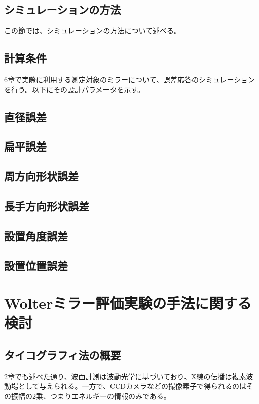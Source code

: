 \documentclass[dvipdfmx,autodetect-engine]{jreport}
\begin{document}
\section{シミュレーションの方法}
この節では、シミュレーションの方法について述べる。

\section{計算条件}
6章で実際に利用する測定対象のミラーについて、誤差応答のシミュレーションを行う。以下にその設計パラメータを示す。

\section{直径誤差}

\section{扁平誤差}

\section{周方向形状誤差}

\section{長手方向形状誤差}

\section{設置角度誤差}

\section{設置位置誤差}

\newpage
\chapter{Wolterミラー評価実験の手法に関する検討}

\newpage
\section{タイコグラフィ法の概要}
2章でも述べた通り、波面計測は波動光学に基づいており、X線の伝播は複素波動場として与えられる。一方で、CCDカメラなどの撮像素子で得られるのはその振幅の2乗、つまりエネルギーの情報のみである。
\end{document}
